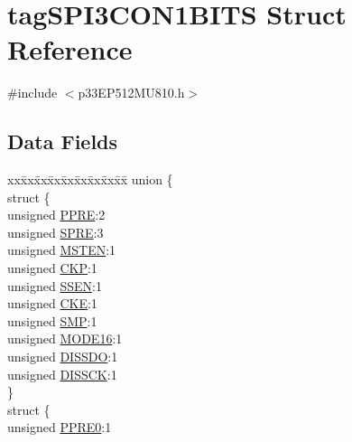 \hypertarget{structtag_s_p_i3_c_o_n1_b_i_t_s}{}\section{tag\+S\+P\+I3\+C\+O\+N1\+B\+I\+TS Struct Reference}
\label{structtag_s_p_i3_c_o_n1_b_i_t_s}


{\ttfamily \#include $<$p33\+E\+P512\+M\+U810.\+h$>$}

\subsection*{Data Fields}
\begin{DoxyCompactItemize}
\item 
\begin{tabbing}
xx\=xx\=xx\=xx\=xx\=xx\=xx\=xx\=xx\=\kill
union \{\\
\>struct \{\\
\>\>unsigned \hyperlink{structtag_s_p_i3_c_o_n1_b_i_t_s_a328a5a76e4d964cd323b8fc7ec480a65}{PPRE}:2\\
\>\>unsigned \hyperlink{structtag_s_p_i3_c_o_n1_b_i_t_s_ac4fc398d060ce31eebf7055f67519250}{SPRE}:3\\
\>\>unsigned \hyperlink{structtag_s_p_i3_c_o_n1_b_i_t_s_acb4900cdfd8a4b59377c2aa8a4fc82c5}{MSTEN}:1\\
\>\>unsigned \hyperlink{structtag_s_p_i3_c_o_n1_b_i_t_s_afb5f6f71e7650f128b6e5c04036cd48f}{CKP}:1\\
\>\>unsigned \hyperlink{structtag_s_p_i3_c_o_n1_b_i_t_s_ae77e6e9fafcdae4e5b7f261d00459ade}{SSEN}:1\\
\>\>unsigned \hyperlink{structtag_s_p_i3_c_o_n1_b_i_t_s_ad6e30ba11b5574f8a5f548a818b64186}{CKE}:1\\
\>\>unsigned \hyperlink{structtag_s_p_i3_c_o_n1_b_i_t_s_a94751e12e00a82cf122e0d82aa7cfdbf}{SMP}:1\\
\>\>unsigned \hyperlink{structtag_s_p_i3_c_o_n1_b_i_t_s_ae096fb6fc65299accb5c75e3d306e425}{MODE16}:1\\
\>\>unsigned \hyperlink{structtag_s_p_i3_c_o_n1_b_i_t_s_a2cbce11395d8c5eb5f91ba935acaea6b}{DISSDO}:1\\
\>\>unsigned \hyperlink{structtag_s_p_i3_c_o_n1_b_i_t_s_ac9a14e83bad7551e878fdaed7d16bfa3}{DISSCK}:1\\
\>\} \\
\>struct \{\\
\>\>unsigned \hyperlink{structtag_s_p_i3_c_o_n1_b_i_t_s_ae7a242158d2a5a81e609501ba93b1d20}{PPRE0}:1\\

\end{tabbing}
\end{DoxyCompactItemize}
